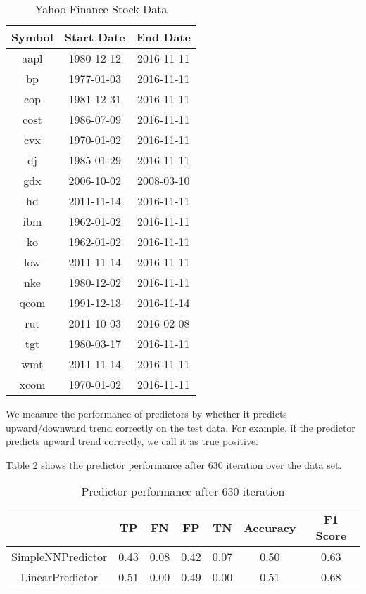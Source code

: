 \documentclass[twocolumn,10pt]{asme2ej}
\begin{document}
\begin{table}
  \begin{tabular}{ccc}
    Symbol & Start Date & End Date \\
    \hline
    aapl & 1980-12-12 & 2016-11-11 \\
    bp & 1977-01-03 & 2016-11-11 \\
    cop & 1981-12-31 & 2016-11-11 \\
    cost & 1986-07-09 & 2016-11-11 \\
    cvx & 1970-01-02 & 2016-11-11 \\
    dj & 1985-01-29 & 2016-11-11 \\
    gdx & 2006-10-02 & 2008-03-10 \\
    hd & 2011-11-14 & 2016-11-11 \\
    ibm & 1962-01-02 & 2016-11-11 \\
    ko & 1962-01-02 & 2016-11-11 \\
    low & 2011-11-14 & 2016-11-11 \\
    nke & 1980-12-02 & 2016-11-11 \\
    qcom & 1991-12-13 & 2016-11-14 \\
    rut & 2011-10-03 & 2016-02-08 \\
    tgt & 1980-03-17 & 2016-11-11 \\
    wmt & 2011-11-14 & 2016-11-11 \\
    xcom & 1970-01-02 & 2016-11-11 \\
  \end{tabular}
  \caption{Yahoo Finance Stock Data}
  \label{yahooStockData}
\end{table}



We measure the performance of predictors by whether it predicts
upward/downward trend correctly on the test data. For example, if the
predictor predicts upward trend correctly, we call it as true
positive.

Table \ref{pperf630} shows the predictor performance after 630
iteration over the data set.



\begin{table}
  \begin{tabular}{c|cccccc}
    & TP & FN & FP & TN & Accuracy & F1 Score \\
    \hline

    SimpleNNPredictor & 0.43 & 0.08 & 0.42 & 0.07 & 0.50 & 0.63 \\
    LinearPredictor & 0.51 & 0.00 & 0.49 & 0.00 & 0.51 & 0.68 \\

  \end{tabular}
  \caption{Predictor performance after 630 iteration}
  \label{pperf630}
\end{table}
\end{document}
